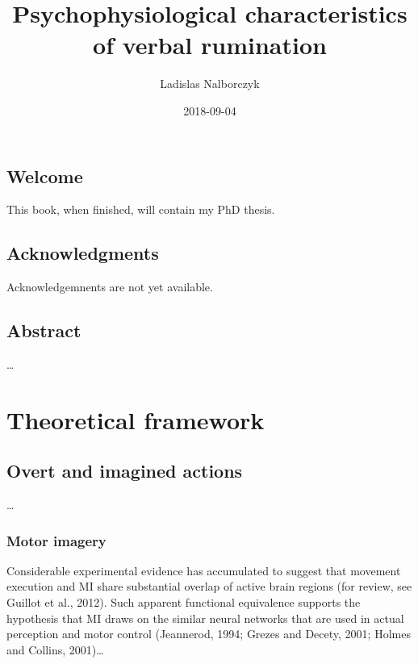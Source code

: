 \documentclass[12pt,]{book}
\title{Psychophysiological characteristics of verbal rumination}
\author{Ladislas Nalborczyk}
\date{2018-09-04}
\begin{document}
\maketitle

{
\setcounter{tocdepth}{1}
\tableofcontents
}
\listoftables
\listoffigures
\chapter*{Welcome}\label{welcome}

This book, when finished, will contain my PhD thesis.

\chapter*{Acknowledgments}\label{acknowledgments}

Acknowledgemnents are not yet available.

\chapter*{Abstract}\label{abstract}

\ldots{}

\part{Theoretical
framework}\label{part-theoretical-framework}

\chapter{Overt and imagined actions}\label{intro}

\ldots{}

\section{Motor imagery}\label{motor-imagery}

Considerable experimental evidence has accumulated to suggest that
movement execution and MI share substantial overlap of active brain
regions (for review, see Guillot et al., 2012). Such apparent functional
equivalence supports the hypothesis that MI draws on the similar neural
networks that are used in actual perception and motor control
(Jeannerod, 1994; Grezes and Decety, 2001; Holmes and Collins,
2001)\ldots{}
\end{document}
